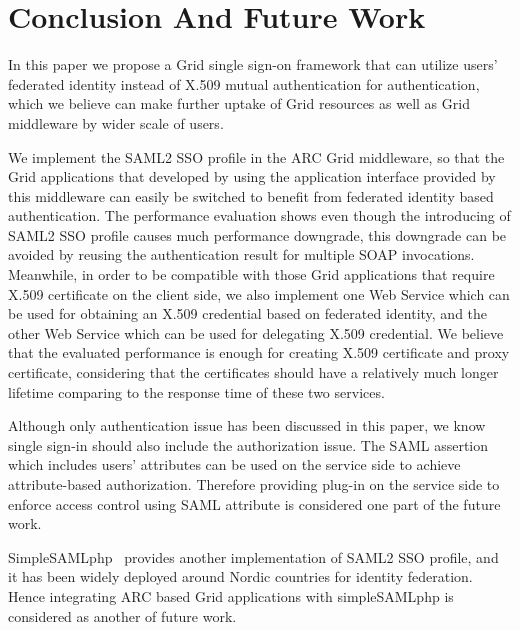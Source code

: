 \documentclass[conference]{IEEEtran}
\begin{document}
\section{Conclusion And Future Work}
\label{sec:conclusion}
In this paper we propose a Grid single sign-on framework that can utilize
users' federated identity instead of X.509 mutual authentication for authentication,
which we believe can make further uptake of Grid resources as well as Grid middleware
by wider scale of users.

We implement the SAML2 SSO profile in the ARC Grid middleware, so that the Grid
applications that developed by using the application interface provided by this middleware
can easily be switched to benefit from federated identity based authentication. 
The performance evaluation shows even though the introducing of SAML2 SSO
profile causes much performance downgrade, this downgrade can be avoided by reusing the
authentication result for multiple SOAP invocations.
Meanwhile, in order to be compatible with those Grid applications that require
X.509 certificate on the client side, we also implement one Web Service which can be
used for obtaining an X.509 credential based on federated identity, and the other Web
Service which can be used for delegating X.509 credential. We believe that the
evaluated performance is enough for creating X.509 certificate and proxy certificate,
considering that the certificates should have a relatively much longer lifetime comparing to the
response time of these two services.
 
Although only authentication issue has been discussed in this paper, we know
single sign-in should also include the authorization issue. The SAML assertion which
includes users' attributes can be used on the service side to achieve attribute-based
authorization. Therefore providing plug-in on the service side to enforce access control using
SAML attribute is considered one part of the future work.

SimpleSAMLphp~\cite{simplesamllink} provides another implementation of SAML2 SSO
profile, and it has been widely deployed around Nordic countries for identity federation. Hence
integrating ARC based Grid applications with simpleSAMLphp is considered as another of
future work.
\end{document}
